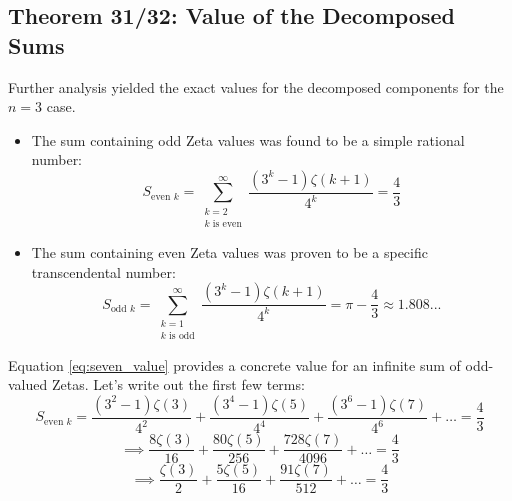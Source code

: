 \documentclass{article}
\begin{document}
\subsection{Theorem 31/32: Value of the Decomposed Sums}
Further analysis yielded the exact values for the decomposed components for the $n=3$ case.
\begin{itemize}
    \item The sum containing odd Zeta values was found to be a simple rational number:
    \begin{equation}
    S_{\text{even } k} = \sum_{\substack{k=2 \\ k \text{ is even}}}^{\infty} \frac{(3^k-1)\zeta(k+1)}{4^k} = \frac{4}{3}
    \label{eq:seven_value}
    \end{equation}
    
    \item The sum containing even Zeta values was proven to be a specific transcendental number:
    \begin{equation}
    S_{\text{odd } k} = \sum_{\substack{k=1 \\ k \text{ is odd}}}^{\infty} \frac{(3^k-1)\zeta(k+1)}{4^k} = \pi - \frac{4}{3} \approx 1.808...
    \label{eq:sodd_value}
    \end{equation}
\end{itemize}
Equation \ref{eq:seven_value} provides a concrete value for an infinite sum of odd-valued Zetas. Let's write out the first few terms:
\begin{equation}
S_{\text{even } k} = \frac{(3^2-1)\zeta(3)}{4^2} + \frac{(3^4-1)\zeta(5)}{4^4} + \frac{(3^6-1)\zeta(7)}{4^6} + \dots = \frac{4}{3} \nonumber
\end{equation}
\begin{equation}
\implies \frac{8\zeta(3)}{16} + \frac{80\zeta(5)}{256} + \frac{728\zeta(7)}{4096} + \dots = \frac{4}{3} \nonumber
\end{equation}
\begin{equation}
\implies \frac{\zeta(3)}{2} + \frac{5\zeta(5)}{16} + \frac{91\zeta(7)}{512} + \dots = \frac{4}{3}
\label{eq:expanded_sum}
\end{equation}
\end{document}
